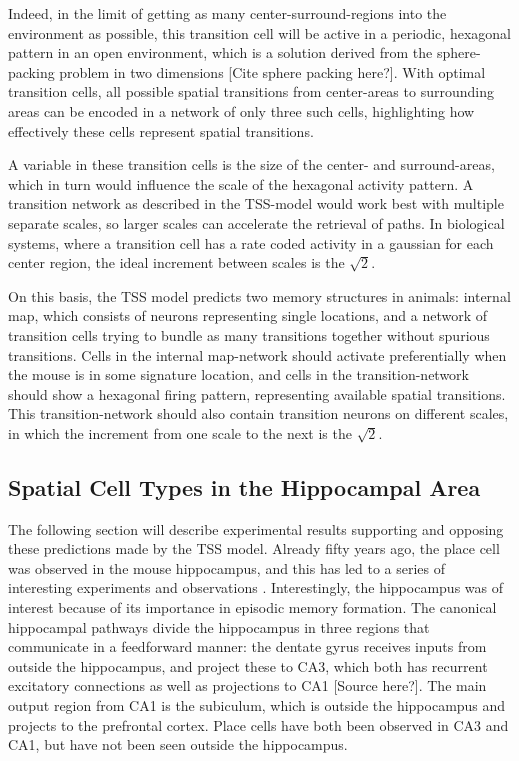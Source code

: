 \documentclass{article}
\begin{document}
    Indeed, in the limit of getting as many center-surround-regions into the environment as possible, this transition cell will be active in a periodic, hexagonal pattern in an open environment, which is a solution derived from the sphere-packing problem in two dimensions \parencite{Waniek2018} [Cite sphere packing here?]. With optimal transition cells, all possible spatial transitions from center-areas to surrounding areas can be encoded in a network of only three such cells, highlighting how effectively these cells represent spatial transitions.

    A variable in these transition cells is the size of the center- and surround-areas, which in turn would influence the scale of the hexagonal activity pattern. A transition network as described in the TSS-model would work best with multiple separate scales, so larger scales can accelerate the retrieval of paths. In biological systems, where a transition cell has a rate coded activity in a gaussian for each center region, the ideal increment between scales is the \(\sqrt{2}\).

    On this basis, the TSS model predicts two memory structures in animals:  internal map, which consists of neurons representing single locations, and a network of transition cells trying to bundle as many transitions together without spurious transitions. Cells in the internal map-network should activate preferentially when the mouse is in some signature location, and cells in the transition-network should show a hexagonal firing pattern, representing available spatial transitions. This transition-network should also contain transition neurons on different scales, in which the increment from one scale to the next is the \(\sqrt{2}\).
    
    \subsection{Spatial Cell Types in the Hippocampal Area}
    The following section will describe experimental results supporting and opposing these predictions made by the TSS model.
    Already fifty years ago, the place cell was observed in the mouse hippocampus, and this has led to a series of interesting experiments and observations \parencite{OKeefe1971,OKeefe1976}. Interestingly, the hippocampus was of interest because of its importance in episodic memory formation. The canonical hippocampal pathways divide the hippocampus in three regions that communicate in a feedforward manner: the dentate gyrus receives inputs from outside the hippocampus, and project these to CA3, which both has recurrent excitatory connections as well as projections to CA1 [Source here?]. The main output region from CA1 is the subiculum, which is outside the hippocampus and projects to the prefrontal cortex. Place cells have both been observed in CA3 and CA1, but have not been seen outside the hippocampus.
\end{document}

